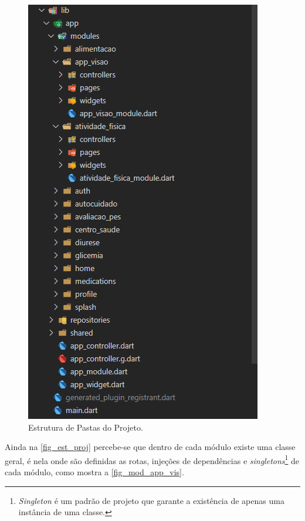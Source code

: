 \begin{figure}[htb]
    \caption{\label{fig_est_proj}Estrutura de Pastas do Projeto.}
    \begin{center}
        \includegraphics[scale=1]{Imagens/desenvolvimento/arquitetura_dia_vision.png}
    \end{center}
\end{figure}

Ainda na \autoref{fig_est_proj} percebe-se que dentro de cada módulo existe uma classe geral, é nela onde são definidas
as rotas, injeções de dependências e \emph{singletons}\footnote{\emph{Singleton} é um padrão de projeto que garante
    a existência de apenas uma instância de uma classe.} de cada módulo, como mostra a \autoref{fig_mod_app_vis}.

\newpage

